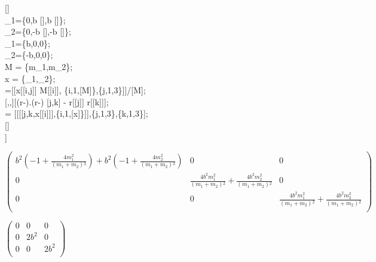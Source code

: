 \documentclass{article}
\begin{document}
[]\\
_1=\{0,b [\theta ],b [\theta ]\};\\
_2=\{0,-b [\theta ],-b [\theta ]\};\\
_1=\{b,0,0\};\\
_2=\{-b,0,0\};\\
M = \left\{m_1,m_2\right\};\\
x = \left\{_1,_2\right\};\\
=[[x[[i,j]] M[[i]], \{i,1,[M]\},\{j,1,3\}]]/[M];\\
[,,]\text{:=}[(r-).(r-) [j,k] - r[[j]]
r[[k]]];\\
 = [[[[j,k,x[[i]]],\{i,1,[x]\}]],\{j,1,3\},\{k,1,3\}];\\
[]\\
\left[\text{FullSimplify}\left[\text{iTensor}, m_1==m_2\right]\right]

\begin{doublespace}
\noindent\(\left(
\begin{array}{ccc}
 b^2 \left(-1+\frac{4 m_1^2}{\left(m_1+m_2\right){}^2}\right)+b^2 \left(-1+\frac{4 m_2^2}{\left(m_1+m_2\right){}^2}\right) & 0 & 0 \\
 0 & \frac{4 b^2 m_1^2}{\left(m_1+m_2\right){}^2}+\frac{4 b^2 m_2^2}{\left(m_1+m_2\right){}^2} & 0 \\
 0 & 0 & \frac{4 b^2 m_1^2}{\left(m_1+m_2\right){}^2}+\frac{4 b^2 m_2^2}{\left(m_1+m_2\right){}^2} \\
\end{array}
\right)\)
\end{doublespace}

\begin{doublespace}
\noindent\(\left(
\begin{array}{ccc}
 0 & 0 & 0 \\
 0 & 2 b^2 & 0 \\
 0 & 0 & 2 b^2 \\
\end{array}
\right)\)
\end{doublespace}
\end{document}
